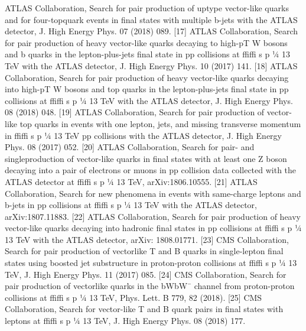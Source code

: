 \begin{itemize}
[16] ATLAS Collaboration, Search for pair production of uptype vector-like quarks and for four-topquark events in final
states with multiple b-jets with the ATLAS detector, J. High
Energy Phys. 07 (2018) 089.
[17] ATLAS Collaboration, Search for pair production of heavy
vector-like quarks decaying to high-pT W bosons and b
quarks in the lepton-plus-jets final state in pp collisions at ffiffi
s p ¼ 13 TeV with the ATLAS detector, J. High Energy
Phys. 10 (2017) 141.
[18] ATLAS Collaboration, Search for pair production of heavy
vector-like quarks decaying into high-pT W bosons and top
quarks in the lepton-plus-jets final state in pp collisions at ffiffi
s p ¼ 13 TeV with the ATLAS detector, J. High Energy
Phys. 08 (2018) 048.
[19] ATLAS Collaboration, Search for pair production of
vector-like top quarks in events with one lepton, jets, and
missing transverse momentum in ffiffi
s p ¼ 13 TeV pp collisions with the ATLAS detector, J. High Energy Phys. 08
(2017) 052.
[20] ATLAS Collaboration, Search for pair- and singleproduction of vector-like quarks in final states with at least
one Z boson decaying into a pair of electrons or muons in
pp collision data collected with the ATLAS detector at ffiffi
s p ¼ 13 TeV, arXiv:1806.10555.
[21] ATLAS Collaboration, Search for new phenomena in events
with same-charge leptons and b-jets in pp collisions at ffiffi
s p ¼ 13 TeV with the ATLAS detector, arXiv:1807.11883.
[22] ATLAS Collaboration, Search for pair production of heavy
vector-like quarks decaying into hadronic final states in pp
collisions at ffiffi
s p ¼ 13 TeV with the ATLAS detector, arXiv:
1808.01771.
[23] CMS Collaboration, Search for pair production of vectorlike T and B quarks in single-lepton final states using
boosted jet substructure in proton-proton collisions at ffiffi
s p ¼ 13 TeV, J. High Energy Phys. 11 (2017) 085.
[24] CMS Collaboration, Search for pair production of vectorlike quarks in the bWbW¯ channel from proton-proton
collisions at ffiffi
s p ¼ 13 TeV, Phys. Lett. B 779, 82 (2018).
[25] CMS Collaboration, Search for vector-like T and B quark
pairs in final states with leptons at ffiffi
s p ¼ 13 TeV, J. High
Energy Phys. 08 (2018) 177.




\end{itemize}